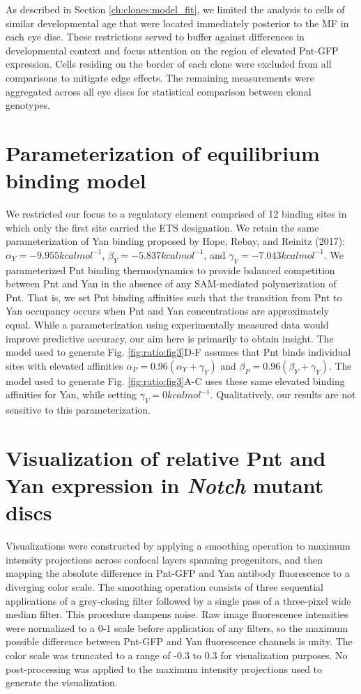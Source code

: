 As described in Section \ref{ch:clones:model_fit}, we limited the analysis to cells of similar developmental age that were located immediately posterior to the MF in each eye disc. These restrictions served to buffer against differences in developmental context and focus attention on the region of elevated Pnt-GFP expression. Cells residing on the border of each clone were excluded from all comparisons to mitigate edge effects. The remaining measurements were aggregated across all eye discs for statistical comparison between clonal genotypes.

\section{Parameterization of equilibrium binding model}
\label{appendix:ratio:model_params}

We restricted our focus to a regulatory element comprised of 12 binding sites in which only the first site carried the ETS designation. We retain the same parameterization of Yan binding proposed by Hope, Rebay, and Reinitz (2017): $\alpha_Y = -9.955 kcal mol^{-1}$, $\beta_Y = -5.837 kcal mol^{-1}$, and $\gamma_Y = -7.043 kcal mol^{-1}$. We parameterized Pnt binding thermodynamics to provide balanced competition between Pnt and Yan in the absence of any SAM-mediated polymerization of Pnt. That is, we set Pnt binding affinities such that the transition from Pnt to Yan occupancy occurs when Pnt and Yan concentrations are approximately equal. While a parameterization using experimentally measured data would improve predictive accuracy, our aim here is primarily to obtain insight. The model used to generate Fig. \ref{fig:ratio:fig3}D-F assumes that Pnt binds individual sites with elevated affinities $\alpha_P = 0.96 (\alpha_Y + \gamma_Y )$ and $\beta_P = 0.96 (\beta_Y + \gamma_Y )$. The model used to generate Fig. \ref{fig:ratio:fig3}A-C uses these same elevated binding affinities for Yan, while setting $\gamma_Y = 0 kcal mol^{-1}$. Qualitatively, our results are not sensitive to this parameterization. 

\section{Visualization of relative Pnt and Yan expression in \textit{Notch} mutant discs}
\label{appendix:ratio:notch_images}

Visualizations were constructed by applying a smoothing operation to maximum intensity projections across confocal layers spanning progenitors, and then mapping the absolute difference in Pnt-GFP and Yan antibody fluorescence to a diverging color scale. The smoothing operation consists of three sequential applications of a grey-closing filter followed by a single pass of a three-pixel wide median filter. This procedure dampens noise. Raw image fluorescence intensities were normalized to a 0-1 scale before application of any filters, so the maximum possible difference between Pnt-GFP and Yan fluorescence channels is unity. The color scale was truncated to a range of -0.3 to 0.3 for visualization purposes. No post-processing was applied to the maximum intensity projections used to generate the visualization.

